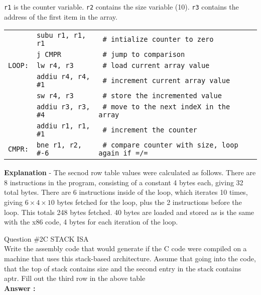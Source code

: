\documentclass[a4paper,11pt]{article}
\newcommand{\answer}{\textbf{Answer : }}
\begin{document}
 \texttt{r1} is the counter variable. \texttt{r2} contains the size variable (10). \texttt{r3} contains the address of the first item in the array.
 \begin{center}
   \begin{tabular}{l l  l}
      \texttt{}      & \texttt{subu r1, r1, r1}    & \texttt{ \# intialize counter to zero} \\
      \texttt{}      & \texttt{j CMPR}             & \texttt{ \# jump to comparison} \\
      \texttt{LOOP:} & \texttt{lw r4, r3}          & \texttt{ \# load current array value} \\
      \texttt{}      & \texttt{addiu r4, r4, \#1}  & \texttt{ \# increment current array value} \\
      \texttt{}      & \texttt{sw r4, r3}          & \texttt{ \# store the incremented value} \\
      \texttt{}      & \texttt{addiu r3, r3, \#4}  & \texttt{ \# move to the next indeX in the array} \\
      \texttt{}      & \texttt{addiu r1, r1, \#1}  & \texttt{ \# increment the counter} \\
      \texttt{CMPR:} & \texttt{bne r1, r2, \#-6}   & \texttt{ \# compare counter with size, loop again if =/=} \\
   \end{tabular}
 \end{center}

 \textbf{Explanation} - The secnod row table values were calculated as follows. There are 8 instructions in the program, consisting of a constant 4 bytes each, giving 32 total bytes. There are 6 instructions inside of the loop, which iterates 10 times, giving $6\times 4 \times 10$ bytes fetched for the loop, plus the 2 instructions before the loop. This totals 248 bytes fetched. 40 bytes are loaded and stored as is the same with the x86 code, 4 bytes for each iteration of the loop.


 \item  Question \#2C STACK ISA \\ Write the assembly code that would generate if the C code were compiled on a machine that uses this stack-based architecture. Assume that going into the code, that the top of stack contains size and the second entry in the stack contains aptr. Fill out the third row in the above table 
 \\ \answer \\
\end{document}
